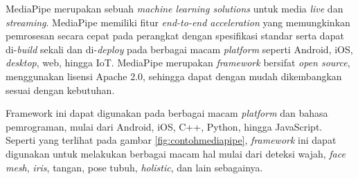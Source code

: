 MediaPipe merupakan sebuah \emph{machine learning solutions} untuk media \emph{live} dan \emph{streaming}.
MediaPipe memiliki fitur \emph{end-to-end acceleration} yang memungkinkan pemrosesan secara cepat pada perangkat dengan spesifikasi standar serta dapat di-\emph{build} sekali dan di-\emph{deploy} pada berbagai macam \emph{platform} seperti Android, iOS, \emph{desktop}, web, hingga IoT.
MediaPipe merupakan \emph{framework} bersifat \emph{open source},
  menggunakan lisensi Apache 2.0, sehingga dapat dengan mudah dikembangkan sesuai dengan kebutuhan.

Framework ini dapat digunakan pada berbagai macam \emph{platform} dan bahasa pemrograman,
  mulai dari Android, iOS, C++, Python, hingga JavaScript.
Seperti yang terlihat pada gambar \ref{fig:contohmediapipe},
  \emph{framework} ini dapat digunakan untuk melakukan berbagai macam hal mulai dari deteksi wajah, \emph{face mesh}, \emph{iris}, tangan, pose tubuh, \emph{holistic}, dan lain sebagainya.

